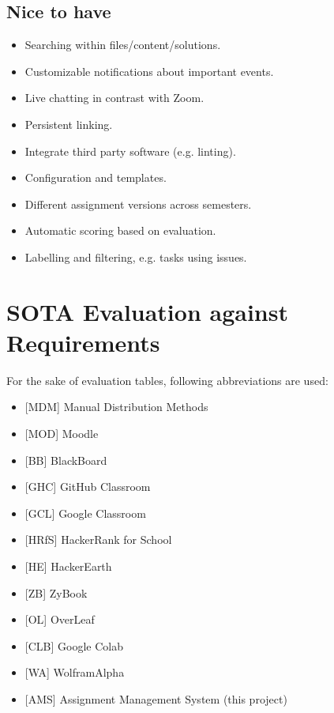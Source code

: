 \subsection{Nice to have} \label{ssec:func-nth}

\begin{itemize}
\item
  {Searching within files/content/solutions.}
\item
  {Customizable notifications about important events.}
\item
  {Live chatting in contrast with Zoom.}
\item
  {Persistent linking.}
\item
  {Integrate third party software (e.g. linting).}
\item
  {Configuration and templates.}
\item
  {Different assignment versions across semesters.}
\item
  {Automatic scoring based on evaluation.}
\item
  {Labelling and filtering, e.g. tasks using issues.}
\end{itemize}

\section{SOTA Evaluation against Requirements} \label{sec:eval}

{For the sake of evaluation tables, following abbreviations are used:}

\begin{itemize}
\item
  {{[}MDM{]} Manual Distribution Methods}
\item
  {{[}MOD{]} Moodle}
\item
  {{[}BB{]} BlackBoard}
\item
  {{[}GHC{]} GitHub Classroom}
\item
  {{[}GCL{]} Google Classroom}
\item
  {{[}HRfS{]} HackerRank for School}
\item
  {{[}HE{]} HackerEarth}
\item
  {{[}ZB{]} ZyBook}
\item
  {{[}OL{]} OverLeaf}
\item
  {{[}CLB{]} Google Colab}
\item
  {{[}WA{]} WolframAlpha}
\item
  {{[}AMS{]} Assignment Management System (this project)}
\end{itemize}

